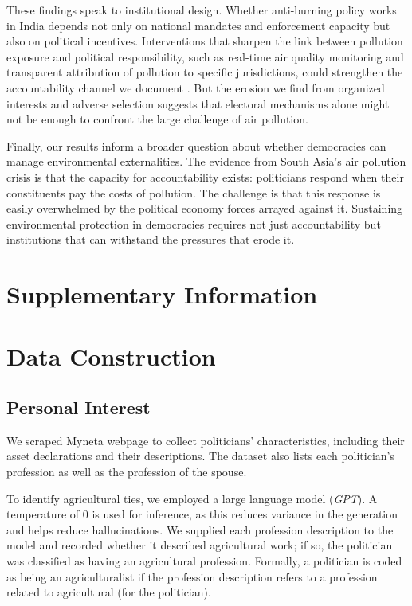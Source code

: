\documentclass[12pt]{article}
\begin{document}
These findings speak to institutional design. Whether anti-burning policy works in India depends not only on national mandates and enforcement capacity but also on political incentives. 
Interventions that sharpen the link between pollution exposure and political responsibility, such as real-time air quality monitoring and transparent attribution of pollution to specific jurisdictions, could strengthen the accountability channel we document \citep{singh_thachil_2023_airpollution}. But the erosion we find from organized interests and adverse selection suggests that electoral mechanisms alone might not be enough to confront the large challenge of air pollution.

Finally, our results inform a broader question about whether democracies can manage environmental externalities. The evidence from South Asia's air pollution crisis is that the capacity for accountability exists: politicians respond when their constituents pay the costs of pollution. The challenge is that this response is easily overwhelmed by the political economy forces arrayed against it. Sustaining environmental protection in democracies requires not just accountability but institutions that can withstand the pressures that erode it.


\clearpage
\FloatBarrier
 

\appendix


\setcounter{page}{1}
\setcounter{figure}{0}
\setcounter{table}{0}
\onehalfspacing

\section*{Supplementary Information}
\section{Data Construction}
\subsection{Personal Interest}\label{sssec:myneta_app}
We scraped Myneta webpage to collect politicians’ characteristics, including their asset declarations and their descriptions. The dataset also lists each politician’s profession as well as the profession of the spouse. 

To identify agricultural ties, we employed a large language model (\emph{GPT}). A temperature of 0 is used for inference, as this reduces variance in the generation and helps reduce hallucinations. We supplied each profession description to the model and recorded whether it described agricultural work; if so, the politician was classified as having an agricultural profession.  
Formally, a politician is coded as being an agriculturalist if the profession description refers to a profession related to agricultural (for the politician).  
\end{document}
